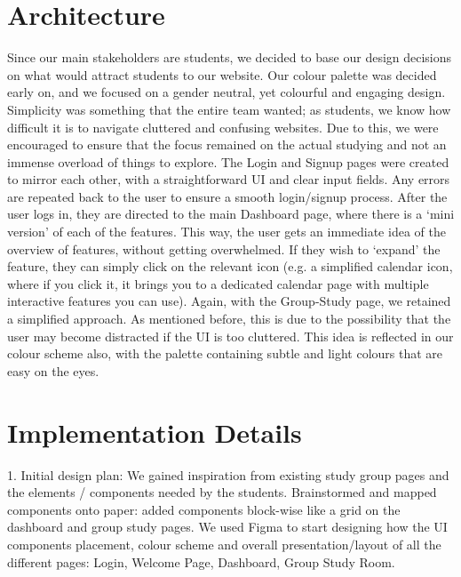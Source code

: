 \section{Architecture}
\label{sect:architecture}

Since our main stakeholders are students, we decided to base our design decisions on what would attract students to our website. Our colour palette was decided early on, and we focused on a gender neutral, yet colourful and engaging design. Simplicity was something that the entire team wanted; as students, we know how difficult it is to navigate cluttered and confusing websites. Due to this, we were encouraged to ensure that the focus remained on the actual studying and not an immense overload of things to explore. The Login and Signup pages were created to mirror each other, with a straightforward UI and clear input fields. Any errors are repeated back to the user to ensure a smooth login/signup process. After the user logs in, they are directed to the main Dashboard page, where there is a ‘mini version’ of each of the features. This way, the user gets an immediate idea of the overview of features, without getting overwhelmed. If they wish to ‘expand’ the feature, they can simply click on the relevant icon (e.g. a simplified calendar icon, where if you click it, it brings you to a dedicated calendar page with multiple interactive features you can use). Again, with the Group-Study page, we retained a simplified approach. As mentioned before, this is due to the possibility that the user may become distracted if the UI is too cluttered. This idea is reflected in our colour scheme also, with the palette containing subtle and light colours that are easy on the eyes.

\section{Implementation Details}
\label{sect:implementation-details}
1. Initial design plan: We gained inspiration from existing study group pages and the elements / components needed by the students. Brainstormed and mapped components onto paper: added components block-wise like a grid on the dashboard and group study pages. We used Figma to start designing how the UI components placement, colour scheme and overall presentation/layout of all the different pages: Login, Welcome Page, Dashboard, Group Study Room.

